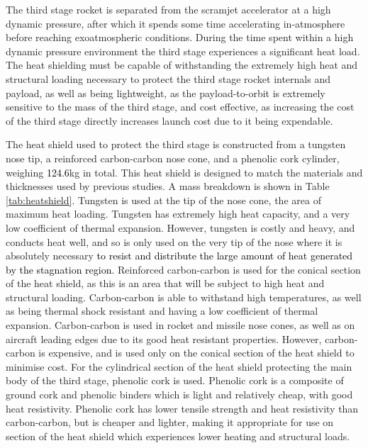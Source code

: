 The third stage rocket is separated from the scramjet accelerator at a high dynamic pressure, after which it spends some time accelerating in-atmosphere before reaching exoatmospheric conditions. During the time spent within a high dynamic pressure environment the third stage experiences a significant heat load. The heat shielding must be capable of withstanding the extremely high heat and structural loading necessary to protect the third stage rocket internals and payload, as well as being lightweight, as the payload-to-orbit is extremely sensitive to the mass of the third stage, and cost effective, as increasing the cost of the third stage directly increases launch cost due to it being expendable. 


The heat shield used to protect the third stage is constructed from a tungsten nose tip, a reinforced carbon-carbon nose cone, and a phenolic cork cylinder, weighing \textcolor{black}{124.6}kg in total. This heat shield is designed to match the materials and thicknesses used by previous studies\cite{Preller2017b}. A mass breakdown is shown in Table \ref{tab:heatshield}.
Tungsten is used at the tip of the nose cone, the area of maximum heat loading. Tungsten has extremely high heat capacity, and a very low coefficient of thermal expansion\cite{tungsten}. However, tungsten is costly and heavy, and conducts heat well, and so is only used on the very tip of the nose where it is absolutely necessary \textcolor{black}{to resist and distribute the large amount of heat generated by the stagnation region}. 
  Reinforced carbon-carbon is used for the conical section of the heat shield, as this is an area that will be subject to high heat and structural loading. Carbon-carbon is able to withstand high temperatures, as well as being thermal shock resistant and having a low coefficient of thermal expansion\cite{Fitzer}. Carbon-carbon is used in rocket and missile nose cones, as well as on aircraft leading edges due to its good heat resistant properties\cite{Fitzer}. However, carbon-carbon is expensive, and is used only on the conical section of the heat shield to minimise cost. For the cylindrical section of the heat shield protecting the main body of the third stage, phenolic cork is used. Phenolic cork is a composite of ground cork and phenolic binders which is light and relatively cheap, with good heat resistivity. Phenolic cork has lower tensile strength and heat resistivity than carbon-carbon\cite{Composites,Fitzer}, but is cheaper and lighter, making it appropriate for use on section of the heat shield which experiences lower heating and structural loads. 

